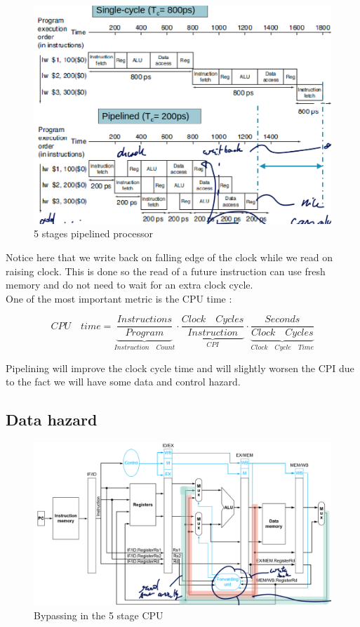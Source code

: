 \documentclass{report}
\begin{document}
\begin{figure}[H]
    \centering
    \includegraphics[width=0.75\linewidth]{5_stage_proc.png}
    \caption{5 stages pipelined processor}
    \label{fig:5-stage-label}
\end{figure}

Notice here that we write back on falling edge of the clock while we read on raising clock. This is done so the read of a future instruction can use fresh memory and do not need to wait for an extra clock cycle.\\

One of the most important metric is the CPU time : 

\begin{equation}
    CPU \quad time = \underbrace{\frac{Instructions}{Program}}_{Instruction \quad Count} \cdot \underbrace{\frac{Clock \quad Cycles}{Instruction}}_{CPI} \cdot \underbrace{\frac{Seconds}{Clock \quad Cycles}}_{Clock \quad Cycle \quad Time}
    \label{eq:fundamental_perf}
\end{equation}

Pipelining will improve the clock cycle time and will slightly worsen the CPI due to the fact we will have some data and control hazard.

\subsection{Data hazard}


\begin{figure}
    \centering
    \includegraphics[width=0.95\linewidth]{data_hazard_bypass.png}
    \caption{Bypassing in the 5 stage CPU}
    \label{fig:hazard-control-label}
\end{figure}
\end{document}
